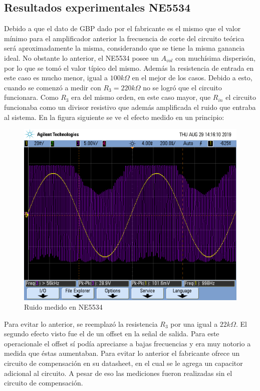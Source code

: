 \subsection{Resultados experimentales NE5534}

Debido a que el dato de GBP dado por el fabricante es el mismo que el valor mínimo para el amplificador anterior la frecuencia de corte del circuito teórica será aproximadamente la misma, considerando que se tiene la misma ganancia ideal. No obstante lo anterior, el NE5534 posee un $A_{vol}$ con muchísima disperisón, por lo que se tomó el valor típico del mismo. Además la resistencia de entrada en este caso es mucho menor, igual a $100k\Omega$ en el mejor de los casos. Debido a esto, cuando se comenzó a medir con $R_3 = 220k\Omega$ no se logró que el circuito funcionara. Como $R_3$ era del mismo orden, en este caso mayor, que $R_{in}$ el circuito funcionaba como un divisor resistivo que además amplificada el ruido que entraba al sistema. En la figura siguiente se ve el efecto medido en un principio:


\begin{figure}[H]	
	\centering
	\includegraphics[width=\textwidth]{Ejercicio2/Imagenes/ruido.png}
	\caption{Ruido medido en NE5534}
	\label{fig:ruido}
\end{figure}

Para evitar lo anterior, se reemplazó la resistencia $R_3$ por una igual a $22k\Omega$. El segundo efecto visto fue el de un offset en la señal de salida. Para este operacionale el offset sí podía apreciarse a bajas frecuencias y era muy notorio a medida que éstas aumentaban. Para evitar lo anterior el fabricante ofrece un circuito de compensación en su datasheet, en el cual se le agrega un capacitor adicional al circuito. A pesar de eso las mediciones fueron realizadas sin el circuito de compensación.

